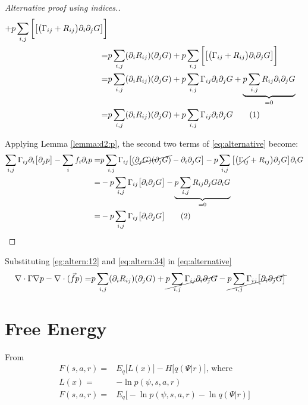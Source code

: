 \documentclass[]{article}
\newcommand\numberthis{\addtocounter{equation}{1}\tag{\theequation}}
\begin{document}
\begin{proof}[Alternative proof using indices.]
\begin{align*}
		+p \sum_{i,j} \bigg[ \big[ \big(\Gamma_{ij} +R_{ij}\big)\partial_i \partial_j G \big] \bigg]  \\
		=&p\sum_{i,j} (\partial_i R_{ij})  (\partial_j G)  +p\sum_{i,j} \bigg[ \big[ \big(\Gamma_{ij} +R_{ij}\big)\partial_i \partial_j G \big] \bigg]  \\
		=&p\sum_{i,j} (\partial_i R_{ij})  (\partial_j G)  +p\sum_{i,j} \Gamma_{ij}\partial_i \partial_j G  +\underbrace{ p\sum_{i,j} R_{ij}\partial_i \partial_j G}_{=0}  \\
		=&p\sum_{i,j} (\partial_i R_{ij})  (\partial_j G)  +p\sum_{i,j} \Gamma_{ij}\partial_i \partial_j G  \numberthis\label{eg:altern:12}
	\end{align*}

	Applying Lemma \ref{lemma:d2:p}, the second two terms of \eqref{eq:alternative} become:
	\begin{align*}
		\sum_{i,j}\Gamma_{ij}\partial_i\big[\partial_j p\big]-  \sum_{i} f_i\partial_i  p =& p\sum_{i,j}\Gamma_{ij}\big[ \cancel{(\partial_j G)(\partial_j G)} -  \partial_i \partial_j G\big] -  p \sum_{i,j} \big[\big(\cancel{\Gamma_{ij}} + R_{ij}\big)\partial_j G\big] \partial_i  G \\
		 =& - p\sum_{i,j}\Gamma_{ij}\big[ \partial_i \partial_j G\big] - \underbrace{ p \sum_{i,j}  R_{ij}\partial_j G \partial_i  G}_{=0}\\
		 =& - p\sum_{i,j}\Gamma_{ij}\big[ \partial_i \partial_j G\big] \numberthis
		 \label{eq:altern:34}
	\end{align*}
\end{proof}
Substituting \eqref{eg:altern:12} and \eqref{eq:altern:34} in \eqref{eq:alternative}
\begin{align*}
	\nabla\cdot\Gamma\nabla p - \nabla \cdot (\vec{f} p) =&p\sum_{i,j} (\partial_i R_{ij})  (\partial_j G)  +\cancel{p\sum_{i,j} \Gamma_{ij}\partial_i \partial_j G} - \cancel{p\sum_{i,j}\Gamma_{ij}\big[ \partial_i \partial_j G\big]}
\end{align*}
\section{Free Energy}


From \cite{friston2016therefore}
\begin{align*}
	F(s,a,r) =& E_q\big[L(x)\big]-H\big[q(\Psi\vert r)\big] \text{, where}\\
	L(x) =& -\ln{p(\psi,s,a,r)}\\
	F(s,a,r) =&  E_q\big[ -\ln{p(\psi,s,a,r)} - \ln{q(\Psi\vert r)}\big]
\end{align*}
\end{document}
